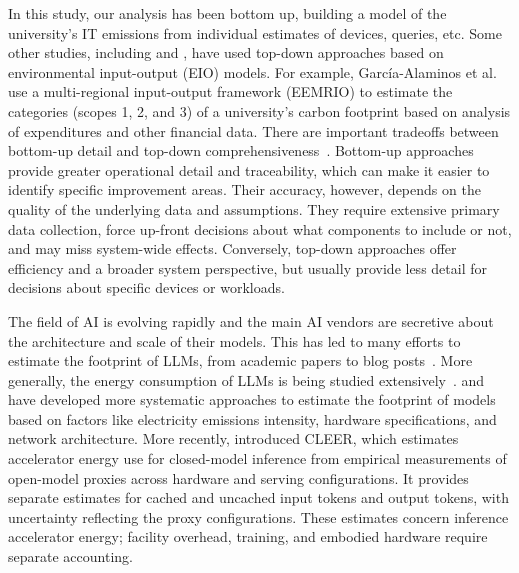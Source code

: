 \documentclass[11pt]{article}
\let\cite\parencite
\begin{document}
In this study, our analysis has been bottom up, building a model of the
university's IT emissions from individual estimates of devices, queries, etc.
Some other studies, including \textcite{larsen:2013} and
\textcite{garciaalaminos:2022}, have used top-down approaches based on
environmental input-output (EIO) models. For example, García-Alaminos et al. use
a multi-regional input-output framework (EEMRIO) to estimate the categories
(scopes 1, 2, and 3) of a university's carbon footprint based on analysis of
expenditures and other financial data. There are important tradeoffs between
bottom-up detail and top-down comprehensiveness~\cite{hilty:2009:lca}.
Bottom-up approaches provide greater operational detail and traceability, which
can make it easier to identify specific improvement areas. Their accuracy,
however, depends on the quality of the underlying data and assumptions. They
require extensive primary data collection, force up-front decisions about what
components to include or not, and may miss system-wide effects. Conversely,
top-down approaches offer efficiency and a broader system perspective, but
usually provide less detail for decisions about specific devices or workloads.

The field of AI is evolving rapidly and the main AI vendors are secretive about
the architecture and scale of their models. This has led to many efforts to
estimate the footprint of LLMs, from academic papers to blog
posts~\cite{devries2023growing,heguerte2023estimate,luccioni2022estimating,ritchie:chatgpt,epoch2025howmuchenergydoeschatgptuse,ritchie:ai:electricity:2026}.
More generally, the energy consumption of LLMs is being studied
extensively~\cite{budennyy2022eco2ai,castano2023exploring,epoch2024optimallyallocatingcomputebetweeninferenceandtraining,gowda2024watt,harding2024watts,luccioni2023counting,patterson2021carbon,rodriguez2024evaluating,tripp2024measuring,jegham2025hungry}.
\textcite{lacoste:mlco2} and \textcite{faiz2024llmcarbon} have developed more
systematic approaches to estimate the footprint of models based on factors like
electricity emissions intensity, hardware specifications, and network
architecture. More recently, \textcite{saig2026cleer} introduced CLEER, which
estimates accelerator energy use for closed-model inference from empirical
measurements of open-model proxies across hardware and serving configurations.
It provides separate estimates for cached and uncached input tokens and output
tokens, with uncertainty reflecting the proxy configurations. These estimates
concern inference accelerator energy; facility overhead, training, and embodied
hardware require separate accounting.
\end{document}
